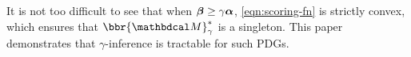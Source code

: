 \documentclass{article}
\newcommand\discard[1]{}
\begin{document}
It is not too difficult to see that when $\boldsymbol\beta \ge \gamma\boldsymbol\alpha$, 
 \eqref{eqn:scoring-fn} is strictly convex, which ensures that
 $\bbr{\dg M}^*_\gamma$ is a singleton.
This paper demonstrates
 that $\gamma$-inference is tractable for such PDGs.
%
\discard{%
    The former is a notational convenience,
    because for $\gamma \in (0, \infty)$,
    $\gamma$-inference is just $1$-inference for a
    slightly different PDG:
    $\bbr{
        \balpha, \bbeta}^*_\gamma = \bbr{
        \gamma \balpha, \bbeta}^*_1$.
    This paper demonstrates the tractability of
    1-inference for the specific case of PDGs satisfying $\bbeta \ge \balpha$, which is sufficient to ensure strict convexity of \eqref{eqn:scoring-fn}, and hence a unique optimal distribution.}%
\end{document}

